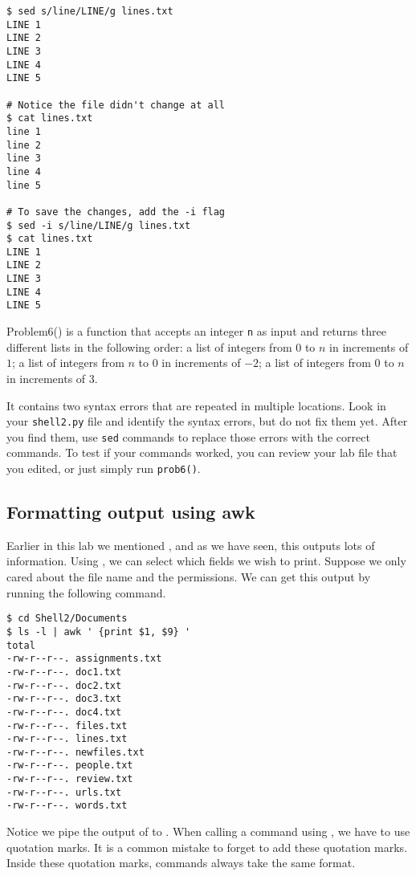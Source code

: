 \begin{lstlisting}
$ sed s/line/LINE/g lines.txt
LINE 1
LINE 2
LINE 3
LINE 4
LINE 5

# Notice the file didn't change at all
$ cat lines.txt
line 1
line 2
line 3
line 4
line 5

# To save the changes, add the -i flag
$ sed -i s/line/LINE/g lines.txt
$ cat lines.txt
LINE 1
LINE 2
LINE 3
LINE 4
LINE 5
\end{lstlisting}

\begin{problem}
Problem6() is a function that accepts an integer \texttt{n} as input and returns three different lists in the following order:
a list of integers from $0$ to $n$ in increments of $1$;
a list of integers from $n$ to $0$ in increments of $-2$;
a list of integers from $0$ to $n$ in increments of $3$.

It contains two syntax errors that are repeated in multiple locations.
Look in your \texttt{shell2.py} file and identify the syntax errors, but do not fix them yet.
After you find them, use \texttt{sed} commands to replace those errors with the correct commands.
To test if your commands worked, you can review your lab file that you edited, or just simply run \texttt{prob6()}. 
\end{problem}

\subsection*{Formatting output using awk} %

Earlier in this lab we mentioned , and as we have seen, this outputs lots of information.
Using , we can select which fields we wish to print.
Suppose we only cared about the file name and the permissions.
We can get this output by running the following command.

\begin{lstlisting}
$ cd Shell2/Documents
$ ls -l | awk ' {print $1, $9} '
total 
-rw-r--r--. assignments.txt
-rw-r--r--. doc1.txt
-rw-r--r--. doc2.txt
-rw-r--r--. doc3.txt
-rw-r--r--. doc4.txt
-rw-r--r--. files.txt
-rw-r--r--. lines.txt
-rw-r--r--. newfiles.txt
-rw-r--r--. people.txt
-rw-r--r--. review.txt
-rw-r--r--. urls.txt
-rw-r--r--. words.txt
\end{lstlisting}

Notice we pipe the output of  to .
When calling a command using , we have to use quotation marks.
It is a common mistake to forget to add these quotation marks.
Inside these quotation marks, commands always take the same format.

